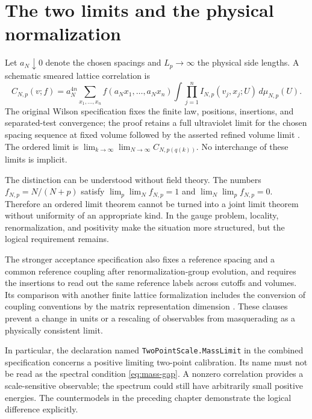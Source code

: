 \section{The two limits and the physical normalization}

Let $a_N\downarrow0$ denote the chosen spacings and $L_p\to\infty$
the physical side lengths.  A schematic smeared lattice correlation is
\begin{equation}
 C_{N,p}(v;f)=a_N^{4n}
 \sum_{x_1,\ldots,x_n}
 f(a_Nx_1,\ldots,a_Nx_n)
 \int\prod_{j=1}^n I_{N,p}(v_j,x_j;U)\,d\mu_{N,p}(U).
 \label{eq:openai-correlations}
\end{equation}
The original Wilson specification fixes the finite law, positions,
insertions, and separated-test convergence; the proof retains a full
ultraviolet limit for the chosen spacing sequence at fixed volume followed
by the asserted refined volume limit \cite{OpenAIWilson2026}.
The ordered limit is
$\lim_{k\to\infty}\lim_{N\to\infty}C_{N,p(q(k))}$.
No interchange of these limits is implicit.

The distinction can be understood without field theory.  The numbers
$f_{N,p}=N/(N+p)$ satisfy
$\lim_p\lim_N f_{N,p}=1$ and
$\lim_N\lim_p f_{N,p}=0$.  Therefore an ordered limit theorem cannot
be turned into a joint limit theorem without uniformity of an appropriate
kind.  In the gauge problem, locality, renormalization, and positivity make
the situation more structured, but the logical requirement remains.

The stronger acceptance specification also fixes a reference spacing and
a common reference coupling after renormalization-group evolution, and
requires the insertions to read out the same reference labels across
cutoffs and volumes.  Its comparison with another finite lattice
formalization includes the conversion of coupling conventions by the
matrix representation dimension \cite{YMAcceptance2026}.  These clauses
prevent a change in units or a rescaling of observables from masquerading
as a physically consistent limit.

In particular, the declaration named
\texttt{TwoPointScale.MassLimit} in the combined specification concerns
a positive limiting two-point calibration.  Its name must not be read as
the spectral condition \eqref{eq:mass-gap}.  A nonzero correlation
provides a scale-sensitive observable; the spectrum could still have
arbitrarily small positive energies.  The countermodels in the preceding
chapter demonstrate the logical difference explicitly.

